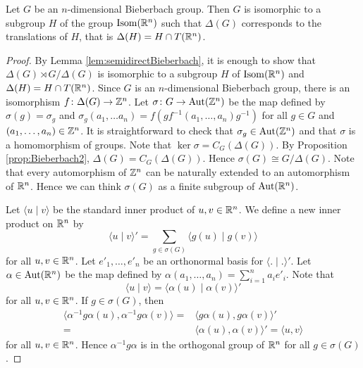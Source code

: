 \begin{theorem}\label{thm:GeomBieberbach}
Let $G$ be an $n$-dimensional Bieberbach group. Then $G$ is isomorphic to a subgroup $H$ of the group $\operatorname{Isom}(\mathbb{R}^n)$ such that $\Delta(G)$ corresponds to the translations of $H$, that is $\Delta(H)=H\cap T(\mathbb{R}^n)$. 
\end{theorem}

\begin{proof} By Lemma \ref{lem:semidirectBieberbach}, it is enough to show that $\Delta(G)\rtimes G/\Delta(G)$ is isomorphic to a subgroup $H$ of $\operatorname{Isom}(\mathbb{R}^n)$ and $\Delta(H)=H\cap T(\mathbb{R}^n)$.
Since $G$ is an $n$-dimensional Bieberbach group, there is an isomorphism $f\colon \Delta(G)\to \mathbb{Z}^n$. Let $\sigma\colon G\to \operatorname{Aut}(\mathbb{Z}^n)$ be the map defined by $\sigma(g)=\sigma_g$ and $\sigma_g(a_1,\dots a_n)=f(gf^{-1}(a_1,\dots ,a_n)g^{-1})$ for all $g\in G$ and $(a_1,\dots ,a_n)\in\mathbb{Z}^n$. It is straightforward to check that $\sigma_g\in\operatorname{Aut}(\mathbb{Z}^n)$ and that $\sigma$ is a homomorphism of groups.
Note that $\ker\sigma=C_G(\Delta(G))$. By Proposition \ref{prop:Bieberbach2}, $\Delta(G)=C_G(\Delta(G))$. Hence $\sigma(G)\cong G/\Delta(G)$. Note that every automorphism of $\mathbb{Z}^n$ can be naturally extended to an automorphism of $\mathbb{R}^n$. Hence we can think $\sigma(G)$ as a finite subgroup of $\operatorname{Aut}(\mathbb{R}^n)$. 

Let $\langle u\mid v\rangle$ be the standard inner product of $u,v\in\mathbb{R}^n$. We define a new inner product on $\mathbb{R}^n$ by
\[ \langle u\mid v\rangle '=\sum_{g\in \sigma(G)}\langle g(u)\mid g(v)\rangle\]
for all $u,v\in\mathbb{R}^n$. Let $e'_1,\dots ,e'_n$ be an orthonormal basis for $\langle .\mid .\rangle '$. Let $\alpha\in \operatorname{Aut}(\mathbb{R}^n)$ be the map defined by $\alpha(a_1,\dots ,a_n)=\sum_{i=1}^na_ie'_i$. Note that
\[ \langle u\mid v\rangle=\langle \alpha (u)\mid \alpha (v)\rangle '\]
for all $u,v\in\mathbb{R}^n$. If $g\in \sigma(G)$, then
\begin{align*}
    \langle \alpha^{-1}g\alpha(u), \alpha^{-1}g\alpha(v)\rangle =&
    \langle g\alpha(u), g\alpha(v)\rangle '\\
    =&\langle \alpha(u), \alpha(v)\rangle '=\langle u, v\rangle 
\end{align*}
for all $u,v\in \mathbb{R}^n$. Hence $\alpha^{-1}g\alpha$ is in the orthogonal group of $\mathbb{R}^n$ for all $g\in \sigma(G)$.


\end{proof}
